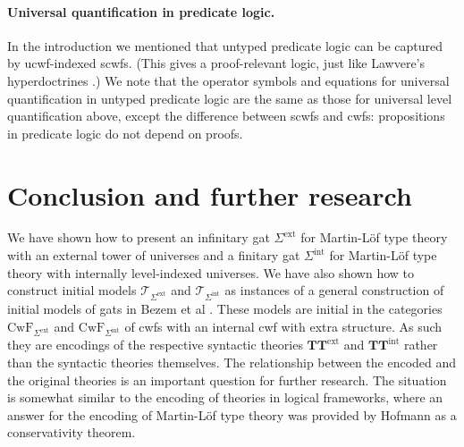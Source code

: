 \documentclass[11pt,a4paper]{article}
\theoremstyle{definition}
\newcommand{\T}{\mathsf{T}}
\def\T{\mathcal{T}}
\def\CwF{\mathrm{CwF}}
\def\Sigmaext{\Sigma^\mathrm{ext}}
\def\Sigmaint{\Sigma^\mathrm{int}}
\def\TText{\mathbf{TT}^\mathrm{ext}}
\def\TTint{\mathbf{TT}^\mathrm{int}}
\begin{document}
\paragraph{Universal quantification in predicate logic.} In the introduction we mentioned that untyped predicate logic can be captured by ucwf-indexed scwfs. (This gives a proof-relevant logic, just like Lawvere's hyperdoctrines \cite{lawvere:hyperdoctrines}.) We note that the operator symbols and equations for universal quantification in untyped predicate logic are the same as those for universal level quantification above, except the difference between scwfs and cwfs: propositions in predicate logic do not depend on proofs.

\section{Conclusion and further research}

We have shown how to present an infinitary gat $\Sigmaext$ for Martin-Löf type theory with an external tower of universes and a finitary gat $\Sigmaint$ for Martin-Löf type theory with internally level-indexed universes. We have also shown how to construct initial models $\T_{\Sigmaext}$ and $\T_{\Sigmaint}$ as instances of a general construction of initial models of gats in 
Bezem et al \cite{bezem:hofmann}. These models are initial in the categories $\CwF_{\Sigmaext}$ and $\CwF_{\Sigmaint}$ of cwfs with an internal cwf with extra structure. 
As such they are encodings of the respective syntactic theories $\TText$ and $\TTint$ rather than the syntactic theories themselves. 
The relationship between the encoded and the original theories is an important question for further research. The situation is somewhat similar to the encoding of theories in logical frameworks, where an answer for the encoding of Martin-Löf type theory was provided by Hofmann \cite{hofmann:cambridge} as a conservativity theorem. 
\end{document}
